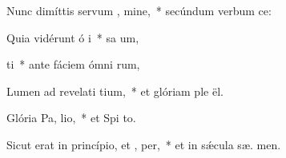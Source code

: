 \item Nunc dimíttis servum , mine,~* secúndum verbum   ce:
\item Quia vidérunt ó i~* sa um,
\item {} ti~* ante fáciem ómni rum,
\item Lumen ad revelati tium,~* et glóriam ple  ël.
\item Glória Pa,  lio,~* et Spi to.
\item Sicut erat in princípio, et ,  per,~* et in sǽcula sæ. men.
